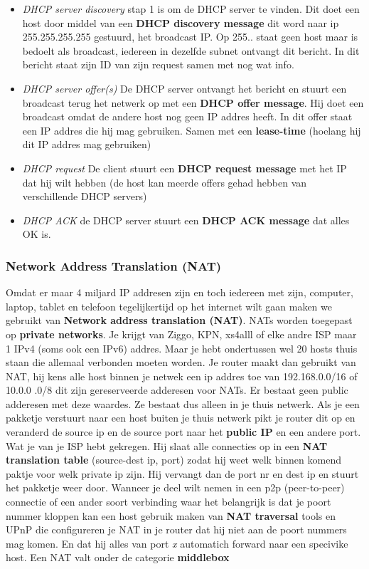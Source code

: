 \begin{itemize}
    \item \textit{DHCP server discovery} stap 1 is om de DHCP server te vinden. Dit doet een host door middel van
een \textbf{DHCP discovery message} dit word naar ip 255.255.255.255 gestuurd, het broadcast IP. Op 255.. staat geen
host maar is bedoelt als broadcast, iedereen in dezelfde subnet ontvangt dit bericht. In dit bericht staat zijn ID van zijn request samen met nog wat info.
    \item \textit{DHCP server offer(s)} De DHCP server ontvangt het bericht en stuurt een broadcast terug het netwerk
    op met een \textbf{DHCP offer message}. Hij doet een broadcast omdat de andere host nog geen IP addres heeft. In
    dit offer staat een IP addres die hij mag gebruiken. Samen met een \textbf{lease-time} (hoelang hij dit IP addres
    mag gebruiken)
    \item \textit{DHCP request} De client stuurt een \textbf{DHCP request message} met het IP dat hij wilt hebben (de
    host kan meerde offers gehad hebben van verschillende DHCP servers)
    \item \textit{DHCP ACK} de DHCP server stuurt een \textbf{DHCP ACK message} dat alles OK is.
\end{itemize}

\subsubsection{Network Address Translation (NAT)}
Omdat er maar 4 miljard IP addresen zijn en toch iedereen met zijn, computer, laptop, tablet en telefoon
tegelijkertijd op het internet wilt gaan maken we gebruikt van \textbf{Network address translation (NAT)}. NATs
worden toegepast op \textbf{private networks}. Je krijgt van Ziggo, KPN, xs4alll of elke andre ISP maar 1 IPv4 (soms
ook een IPv6) addres. Maar je hebt ondertussen wel 20 hosts thuis staan die allemaal verbonden moeten worden. Je
router maakt dan gebruikt van NAT, hij kens alle host binnen je netwek een ip addres toe van 192.168.0.0/16 of 10.0.0
.0/8 dit zijn gereserveerde adderesen voor NATs. Er bestaat geen public adderesen met deze waardes. Ze bestaat dus
alleen in je thuis netwerk. Als je een pakketje verstuurt naar een host buiten je thuis netwerk pikt je router dit op
en veranderd de source ip en de source port naar het \textbf{public IP} en een andere port. Wat je van je ISP hebt
gekregen. Hij slaat alle connecties op in een \textbf{NAT translation table} (source-dest ip, port) zodat hij weet welk binnen komend paktje voor welk private ip zijn. Hij vervangt dan de port nr en dest ip en stuurt het pakketje weer
door.
\newline
Wanneer je deel wilt nemen in een p2p (peer-to-peer) connectie of een ander soort verbinding waar het belangrijk is
dat je poort nummer kloppen kan een host gebruik maken van \textbf{NAT traversal} tools en UPnP die configureren je
NAT in je router dat hij niet aan de poort nummers mag komen. En dat hij alles van port \textit{x} automatich forward
naar een specivike host.
Een NAT valt onder de categorie \textbf{middlebox}


